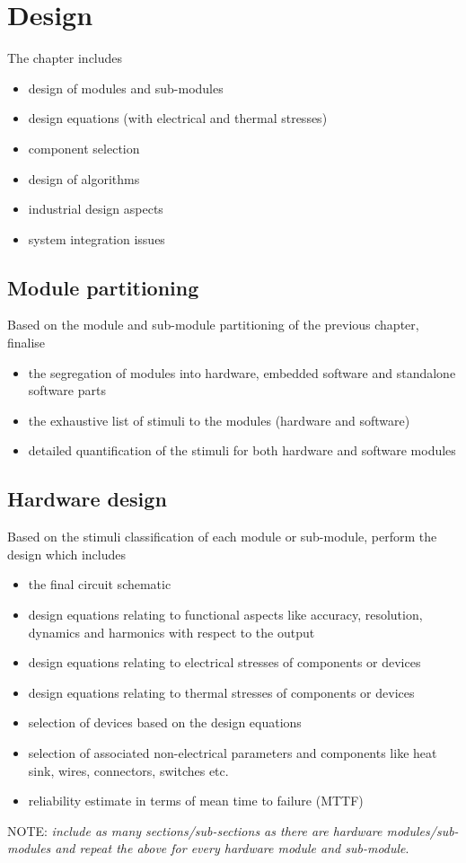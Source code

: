 
\chapter{Design}

The chapter includes
\begin{itemize}
\item design of modules and sub-modules
\item design equations (with electrical and thermal stresses)
\item component selection
\item design of algorithms
\item industrial design aspects
\item system integration issues
\end{itemize}

\section{Module partitioning}

Based on the module and sub-module partitioning of the previous chapter,
finalise
\begin{itemize}
\item the segregation of modules into hardware, embedded software and standalone
software parts
\item the exhaustive list of stimuli to the modules (hardware and software)
\item detailed quantification of the stimuli for both hardware and software
modules
\end{itemize}

\section{Hardware design}

Based on the stimuli classification of each module or sub-module,
perform the design which includes
\begin{itemize}
\item the final circuit schematic
\item design equations relating to functional aspects like accuracy, resolution,
dynamics and harmonics with respect to the output
\item design equations relating to electrical stresses of components or
devices
\item design equations relating to thermal stresses of components or devices
\item selection of devices based on the design equations
\item selection of associated non-electrical parameters and components like
heat sink, wires, connectors, switches etc.
\item reliability estimate in terms of mean time to failure (MTTF)
\end{itemize}
NOTE: \emph{include as many sections/sub-sections as there are hardware
modules/sub-modules and repeat the above for every hardware module
and sub-module}.

